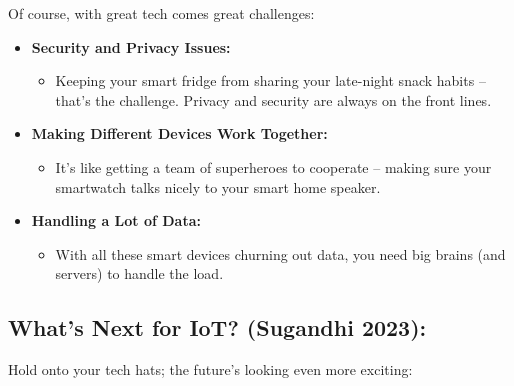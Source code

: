 \documentclass[
  letterpaper,
  DIV=11,
  numbers=noendperiod]{scrreprt}
\providecommand{\tightlist}{%
  \setlength{\itemsep}{0pt}\setlength{\parskip}{0pt}}\usepackage{longtable,booktabs,array}
\begin{document}
Of course, with great tech comes great challenges:

\begin{itemize}
\item
  \textbf{Security and Privacy Issues:}

  \begin{itemize}
  \tightlist
  \item
    Keeping your smart fridge from sharing your late-night snack habits
    -- that's the challenge. Privacy and security are always on the
    front lines.
  \end{itemize}
\item
  \textbf{Making Different Devices Work Together:}

  \begin{itemize}
  \tightlist
  \item
    It's like getting a team of superheroes to cooperate -- making sure
    your smartwatch talks nicely to your smart home speaker.
  \end{itemize}
\item
  \textbf{Handling a Lot of Data:}

  \begin{itemize}
  \tightlist
  \item
    With all these smart devices churning out data, you need big brains
    (and servers) to handle the load.
  \end{itemize}
\end{itemize}

\subsection{What's Next for IoT? (Sugandhi
2023):}\label{whats-next-for-iot-sugandhi2023iotfuture}

Hold onto your tech hats; the future's looking even more exciting:
\end{document}
